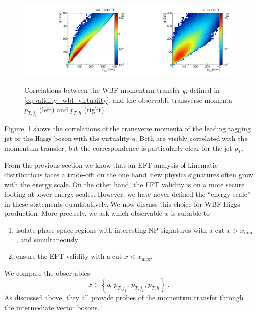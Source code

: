 \begin{figure}
  \includegraphics[width=0.49\textwidth]{fig/validity/WBF_correl_q_j1pt.pdf}%
  \includegraphics[width=0.49\textwidth]{fig/validity/WBF_correl_q_Hpt.pdf}%
  \caption{Correlations between the WBF momentum transfer $q$, defined
    in \autoref{eq:validity_wbf_virtuality}, and the observable
    transverse momenta $p_{T,j_1}$ (left) and $p_{T,h}$ (right).}
  \label{fig:validity_virtuality_correlations}
\end{figure}

Figure~\ref{fig:validity_virtuality_correlations} shows the
correlations of the transverse momenta of the leading tagging jet or
the Higgs boson with the virtuality $q$. Both are visibly correlated
with the momentum transfer, but the correspondence is particularly
clear for the jet $p_T$.

\newparagraph
%
From the previous section we know that an EFT analysis of kinematic
distributions faces a trade-off: on the one hand, new physics
signatures often grow with the energy scale. On the other hand, the
EFT validity is on a more secure footing at lower energy
scales. However, we have never defined the ``energy scale'' in these
statements quantitatively. We now discuss this choice for WBF Higgs
production. More precisely, we ask which observable $x$ is suitable to
%
\begin{enumerate}
\item isolate phase-space regions with interesting NP signatures with
  a cut $x > x_{\text{min}}$, and simultaneously
\item ensure the EFT validity with a cut $x < x_{\text{max}}$.
\end{enumerate}
%
We compare the observables
%
\begin{equation}
  x \in \left\{  q, \, p_{T,j_1}, \, p_{T,j_2}, \, p_{T,h} \right\} \,.
\end{equation}
%
As discussed above, they all provide probes of the momentum transfer
through the intermediate vector bosons. 

